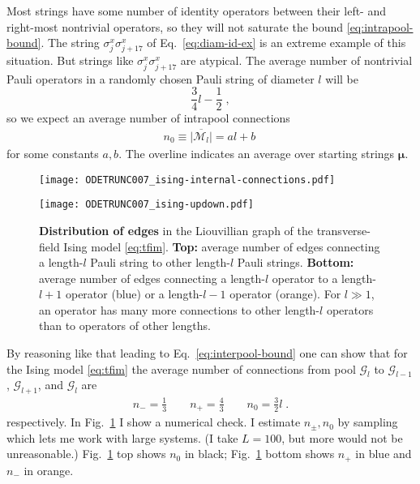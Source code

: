 \documentclass[aps,prb,nofootinbib,twocolumn,balancelastpage,amsmath,amssymb,floatfix,superscriptaddress,]{revtex4-1}
\newcommand{\pool}{\mathcal G}
\begin{document}
Most strings have some number of identity operators between their left- and right-most nontrivial operators,
so they will not saturate the bound \eqref{eq:intrapool-bound}.
The string $\sigma^x_j\sigma^x_{j+17}$ of Eq.~\eqref{eq:diam-id-ex} is an extreme example of this situation.
But strings like $\sigma^x_j\sigma^x_{j+17}$ are atypical.
The average number of nontrivial Pauli operators in a randomly chosen Pauli string of diameter $l$ will be
\[ \frac 3 4 l - \frac 1 2\;, \] %
so we expect an average number of intrapool connections
\begin{align}
  \label{eq:intrapool-degree}
  n_0 \equiv \overline{|\mathcal M_{l}|} = a l + b\
\end{align}
for some constants $a,b$.
The overline indicates an average over starting strings $\bm \mu$.

\begin{figure}[t!]

  
  \begin{minipage}{0.45\textwidth}
    \texttt{[image: ODETRUNC007\_ising-internal-connections.pdf]}
  \end{minipage}

  \begin{minipage}{0.45\textwidth}
    \texttt{[image: ODETRUNC007\_ising-updown.pdf]}
  \end{minipage}
  
  \caption{\textbf{Distribution of edges} in the Liouvillian graph of the transverse-field Ising model \eqref{eq:tfim}.
    \textbf{Top:} average number of edges connecting a length-$l$ Pauli string to other length-$l$ Pauli strings.
    \textbf{Bottom:} average number of edges connecting a length-$l$ operator to a length-$l+1$ operator (blue) or a length-$l-1$ operator (orange).
    For $l \gg 1$, an operator has many more connections to other length-$l$ operators than to operators of other lengths.
  }
  \label{fig:internal-connections}
\end{figure}

By reasoning like that leading to Eq.~\eqref{eq:interpool-bound} one can show that for the Ising model \eqref{eq:tfim}
the average number of connections from pool $\pool_l$ to $\pool_{l-1}$, $\pool_{l+1}$, and $\pool_{l}$  are
\begin{align}
  n_- = \frac 1 3 \qquad n_+ = \frac 4 3  \qquad n_0 = \frac 3 2 l\;.
\end{align}
respectively.
In Fig.~\ref{fig:internal-connections} I show a numerical check.
I estimate $n_\pm, n_0$ by sampling
which lets me work with large systems.
(I take $L = 100$, but more would not be unreasonable.)
Fig.~\ref{fig:internal-connections} top shows $n_0$ in black;
Fig.~\ref{fig:internal-connections} bottom shows $n_+$ in blue and $n_-$ in orange.
\end{document}
